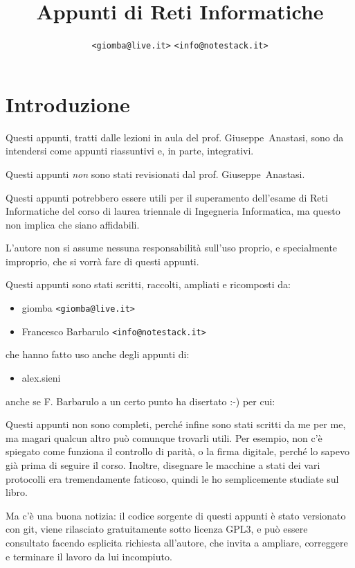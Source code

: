 \documentclass[12pt,a4paper]{article}
\title{Appunti di Reti Informatiche}
\author{\texttt{<giomba@live.it>} \texttt{<info@notestack.it>}}
\date{}
\begin{document}
\maketitle
\tableofcontents

\clearpage

\section{Introduzione}
Questi appunti, tratti dalle lezioni in aula del prof. Giuseppe~Anastasi,
sono da intendersi come appunti riassuntivi e, in parte, integrativi.

Questi appunti \emph{non} sono stati revisionati dal prof. Giuseppe~Anastasi.

Questi appunti potrebbero essere utili per il superamento dell'esame di
Reti Informatiche del corso di laurea triennale di Ingegneria Informatica,
ma questo non implica che siano affidabili.

L'autore non si assume nessuna responsabilità sull'uso proprio,
e specialmente improprio, che si vorrà fare di questi appunti.

Questi appunti sono stati scritti, raccolti, ampliati e ricomposti da:
\begin{itemize}
  \item giomba \texttt{<giomba@live.it>}
  \item Francesco Barbarulo {\small \texttt{<info@notestack.it>}}
\end{itemize}
che hanno fatto uso anche degli appunti di:
\begin{itemize}
  \item alex.sieni
\end{itemize}
anche se F. Barbarulo a un certo punto ha disertato :-) per cui:

Questi appunti non sono completi, perché infine sono stati scritti da
me per me, ma magari qualcun altro può comunque trovarli utili.
Per esempio, non c'è spiegato come funziona il controllo di parità,
o la firma digitale, perché lo sapevo già prima di seguire il corso.
Inoltre, disegnare le macchine a stati dei vari protocolli era
tremendamente faticoso, quindi le ho semplicemente studiate sul libro.

Ma c'è una buona notizia: il codice sorgente di questi appunti è stato
versionato con git, viene rilasciato gratuitamente sotto licenza GPL3,
e può essere consultato facendo esplicita richiesta all'autore, che
invita a ampliare, correggere e terminare il lavoro da lui incompiuto.
\end{document}
